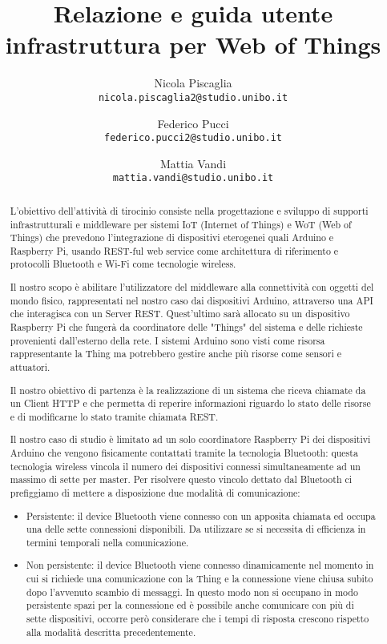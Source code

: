 \documentclass[11pt,a4paper]{article}
\title{\textbf{\huge{Relazione e guida utente infrastruttura per Web of Things}}}
\author{
    Nicola Piscaglia\\
    \texttt{nicola.piscaglia2@studio.unibo.it}
    \and
    Federico Pucci\\
    \texttt{federico.pucci2@studio.unibo.it}
    \and
    Mattia Vandi\\
    \texttt{mattia.vandi@studio.unibo.it}
}
\begin{document}
\maketitle

\begin{abstract}

L'obiettivo dell'attivit\`a di tirocinio consiste nella progettazione e sviluppo di supporti infrastrutturali e middleware per sistemi IoT (Internet of Things) e WoT (Web of Things) che prevedono l'integrazione di dispositivi eterogenei quali Arduino e Raspberry Pi, usando REST-ful web service come architettura di riferimento e protocolli Bluetooth e Wi-Fi come tecnologie wireless.

Il nostro scopo \`e abilitare l'utilizzatore del middleware alla connettivit\`a con oggetti del mondo fisico, rappresentati nel nostro caso dai dispositivi Arduino, attraverso una API che interagisca con un Server REST.
%
Quest'ultimo sar\`a allocato su un dispositivo Raspberry Pi che funger\`a da coordinatore delle "Things" del sistema e delle richieste provenienti dall'esterno della rete.
%
I sistemi Arduino sono visti come risorsa rappresentante la Thing ma potrebbero gestire anche pi\`u risorse come sensori e attuatori.

Il nostro obiettivo di partenza \`e la realizzazione di un sistema che riceva chiamate da un Client HTTP e che permetta di reperire informazioni riguardo lo stato delle risorse e di modificarne lo stato tramite chiamata REST.

Il nostro caso di studio \`e limitato ad un solo coordinatore Raspberry Pi dei dispositivi Arduino che vengono fisicamente contattati tramite la tecnologia Bluetooth: questa tecnologia wireless vincola il numero dei dispositivi connessi simultaneamente ad un massimo di sette per master.
%
Per risolvere questo vincolo dettato dal Bluetooth ci prefiggiamo di mettere a disposizione due modalit\`a di comunicazione:

\begin{itemize}

\item Persistente: il device Bluetooth viene connesso con un apposita chiamata ed occupa una delle sette connessioni disponibili.
%
Da utilizzare se si necessita di efficienza in termini temporali nella comunicazione.

\item Non persistente: il device Bluetooth viene connesso dinamicamente nel momento in cui si richiede una comunicazione con la Thing e la connessione viene chiusa subito dopo l'avvenuto scambio di messaggi.
%
In questo modo non si occupano in modo persistente spazi per la connessione ed \`e possibile anche comunicare con pi\`u di sette dispositivi, occorre per\`o considerare che i tempi di risposta crescono rispetto alla modalit\`a descritta precedentemente.


\end{itemize}
\end{abstract}
\end{document}
